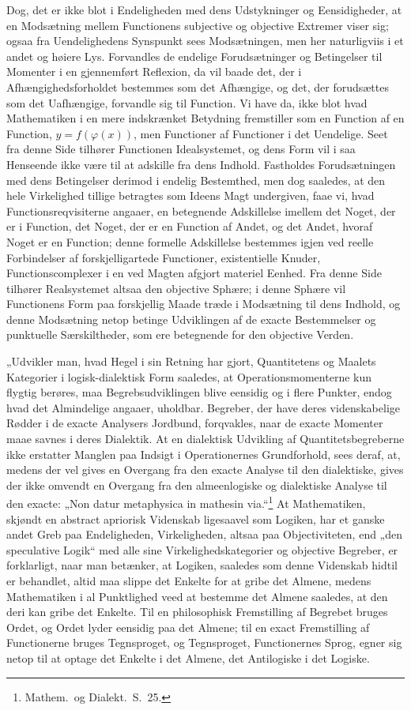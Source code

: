 \documentclass[12pt]{book}
\newcommand{\opage}[1]{\marginnote{\footnotesize\textit{[#1]}}}
\begin{document}
Dog, det er ikke blot i Endeligheden med dens Udstykninger og Eensidigheder, at en Modsætning mellem
Functionens subjective og objective Extremer viser sig; ogsaa fra Uendelighedens Synspunkt sees
Modsætningen, men her naturligviis i et andet og høiere Lys. Forvandles de endelige Forudsætninger og
Betingelser til Momenter i en gjennemført Reflexion, da vil baade det, der i Afhængighedsforholdet
bestemmes som det Afhængige, og det, der forudsættes som det Uafhængige, forvandle sig til Function. Vi
have da, ikke blot hvad Mathematiken i en mere indskrænket Betydning fremstiller som en Function af en
Function, $y = f(\varphi(x))$, men Functioner af Functioner i det Uendelige. Seet fra denne Side
tilhører Functionen Idealsystemet, og dens Form vil i saa Henseende ikke være til at adskille fra dens
Indhold. Fastholdes Forudsætningen med dens Betingelser derimod i endelig Bestemthed, men dog saaledes,
at den hele Virkelighed tillige betragtes som Ideens Magt undergiven, faae vi, hvad
Functionsreqvisiterne angaaer, en betegnende Adskillelse imellem det Noget, der er i Function, det
Noget, der er en Function af Andet, og det Andet, hvoraf Noget er en Function; denne formelle
Adskillelse bestemmes igjen ved reelle Forbindelser af forskjelligartede Functioner, existentielle
Knuder, Functionscomplexer i en ved Magten afgjort materiel Eenhed. Fra denne Side tilhører
Realsystemet altsaa den objective Sphære; i denne Sphære vil Functionens Form paa forskjellig Maade
træde i Modsætning til dens Indhold, og denne Modsætning netop betinge Udviklingen af de exacte
Bestemmelser og punktuelle Særskiltheder, som ere betegnende for den objective Verden.

„Udvikler man, hvad Hegel i sin Retning har gjort,
\opage{283} Quantitetens og Maalets Kategorier i logisk-dialektisk Form saaledes, at Operationsmomenterne kun
flygtig berøres, maa Begrebsudviklingen blive eensidig og i flere Punkter, endog hvad det Almindelige
angaaer, uholdbar. Begreber, der have deres videnskabelige Rødder i de exacte Analysers Jordbund,
forqvakles, naar de exacte Momenter maae savnes i deres Dialektik. At en dialektisk Udvikling af
Quantitetsbegreberne ikke erstatter Manglen paa Indsigt i Operationernes Grundforhold, sees deraf, at,
medens der vel gives en Overgang fra den exacte Analyse til den dialektiske, gives der ikke omvendt en
Overgang fra den almeenlogiske og dialektiske Analyse til den exacte: „Non datur metaphysica in
mathesin via.“\footnote{Mathem.\ og Dialekt.\ S.~25.} At Mathematiken, skjøndt en abstract apriorisk
Videnskab ligesaavel som Logiken, har et ganske andet Greb paa Endeligheden, Virkeligheden, altsaa paa
Objectiviteten, end „den speculative Logik“ med alle sine Virkelighedskategorier og objective Begreber,
er forklarligt, naar man betænker, at Logiken, saaledes som denne Videnskab hidtil er behandlet, altid
maa slippe det Enkelte for at gribe det Almene, medens Mathematiken i al Punktlighed veed at bestemme
det Almene saaledes, at den deri kan gribe det Enkelte. Til en philosophisk Fremstilling af Begrebet
bruges Ordet, og Ordet lyder eensidig paa det Almene; til en exact Fremstilling af Functionerne bruges
Tegnsproget, og Tegnsproget, Functionernes Sprog, egner sig netop til at optage det Enkelte i det
Almene, det Antilogiske i det Logiske.
\end{document}
